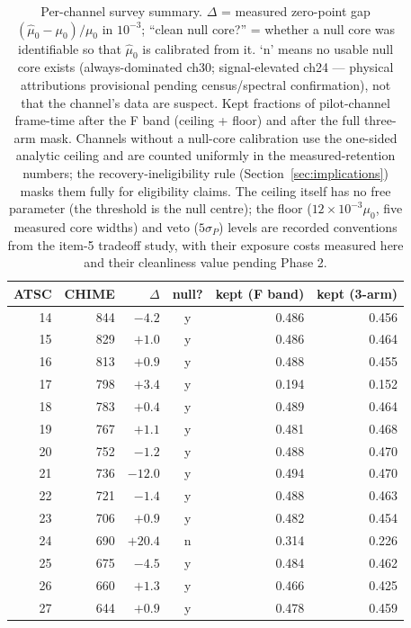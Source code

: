 \begin{table}
  \centering
  \caption{Per-channel survey summary. $\Delta$ = measured zero-point gap
  $(\hat\mu_0-\mu_0)/\mu_0$ in $10^{-3}$; ``clean null core?'' = whether
  a null core was identifiable so that $\hat\mu_0$ is calibrated from it.
  `n' means no usable null core exists (always-dominated ch30;
  signal-elevated ch24 --- physical attributions provisional pending
  census/spectral confirmation), not that the channel's data are suspect.
  Kept fractions of pilot-channel frame-time after the F band (ceiling +
  floor) and after the full three-arm mask. Channels without a null-core
  calibration use the one-sided analytic ceiling and are counted
  uniformly in the measured-retention numbers; the recovery-ineligibility
  rule (Section~\ref{sec:implications}) masks them fully for
  eligibility claims. The ceiling itself has no
  free parameter (the threshold is the null centre); the floor
  ($12\times10^{-3}\mu_0$, five measured core widths) and veto
  ($5\sigma_P$) levels are recorded conventions from the item-5
  tradeoff study, with their exposure costs measured here and their
  cleanliness value pending Phase 2.}
  \label{tab:perchannel}
  \begin{tabular}{rrrcrr}
    \toprule
    ATSC & CHIME & $\Delta$ & null? & kept (F band) & kept (3-arm) \\
    \midrule
    14 & 844 & $-4.2$ & y & 0.486 & 0.456 \\
    15 & 829 & $+1.0$ & y & 0.486 & 0.464 \\
    16 & 813 & $+0.9$ & y & 0.488 & 0.455 \\
    17 & 798 & $+3.4$ & y & 0.194 & 0.152 \\
    18 & 783 & $+0.4$ & y & 0.489 & 0.464 \\
    19 & 767 & $+1.1$ & y & 0.481 & 0.468 \\
    20 & 752 & $-1.2$ & y & 0.488 & 0.470 \\
    21 & 736 & $-12.0$ & y & 0.494 & 0.470 \\
    22 & 721 & $-1.4$ & y & 0.488 & 0.463 \\
    23 & 706 & $+0.9$ & y & 0.482 & 0.454 \\
    24 & 690 & $+20.4$ & n & 0.314 & 0.226 \\
    25 & 675 & $-4.5$ & y & 0.484 & 0.462 \\
    26 & 660 & $+1.3$ & y & 0.466 & 0.425 \\
    27 & 644 & $+0.9$ & y & 0.478 & 0.459 \\

\end{tabular}
\end{table}
